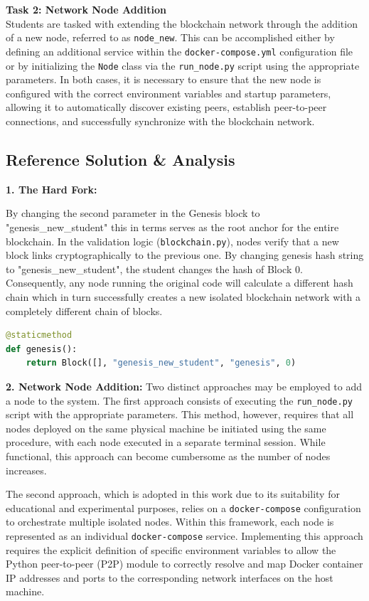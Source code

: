 \textbf{Task 2: Network Node Addition} \\

Students are tasked with extending the blockchain network through the addition of a new node, referred to as \texttt{node\_new}. This can be accomplished either by defining an additional service within the \texttt{docker-compose.yml} configuration file or by initializing the \texttt{Node} class via the \texttt{run\_node.py} script using the appropriate parameters. In both cases, it is necessary to ensure that the new node is configured with the correct environment variables and startup parameters, allowing it to automatically discover existing peers, establish peer-to-peer connections, and successfully synchronize with the blockchain network.


\subsection{Reference Solution \& Analysis}

\textbf{1. The Hard Fork:}

By changing the second parameter in the Genesis block to "genesis\_new\_student" this in terms serves as the root anchor for the entire blockchain. In the validation logic (\texttt{blockchain.py}), nodes verify that a new block links cryptographically to the previous one. By changing genesis hash string to "genesis\_new\_student", the student changes the hash of Block 0. Consequently, any node running the original code will calculate a different hash chain which in turn successfully creates a new isolated blockchain network with a completely different chain of blocks.

\begin{lstlisting}[language=Python, caption=Genesis Block Modification, label=lst:mod1_genesis]
@staticmethod
def genesis():
    return Block([], "genesis_new_student", "genesis", 0)
\end{lstlisting}


\textbf{2. Network Node Addition:}
Two distinct approaches may be employed to add a node to the system. The first approach consists of executing the \texttt{run\_node.py} script with the appropriate parameters. This method, however, requires that all nodes deployed on the same physical machine be initiated using the same procedure, with each node executed in a separate terminal session. While functional, this approach can become cumbersome as the number of nodes increases.

The second approach, which is adopted in this work due to its suitability for educational and experimental purposes, relies on a \texttt{docker-compose} configuration to orchestrate multiple isolated nodes. Within this framework, each node is represented as an individual \texttt{docker-compose} service. Implementing this approach requires the explicit definition of specific environment variables to allow the Python peer-to-peer (P2P) module to correctly resolve and map Docker container IP addresses and ports to the corresponding network interfaces on the host machine.

